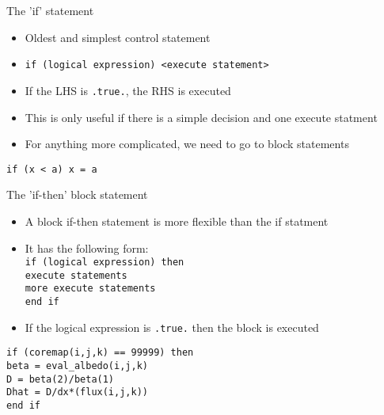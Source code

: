\documentclass{beamer}
\begin{document}
\begin{frame}{The 'if' statement}
  
  \begin{itemize}
    \item Oldest and simplest control statement
    \vfill\item \texttt{if (logical expression) <execute statement>}
    \vfill\item If the LHS is \texttt{.true.}, the RHS is executed
    \vfill\item This is only useful if there is a simple decision and one execute statment
    \vfill\item For anything more complicated, we need to go to block statements
  \end{itemize}
  \vfill
  \begin{center}
    \texttt{if (x < a) x = a}
  \end{center}
\end{frame}
\begin{frame}{The 'if-then' block statement}

  \begin{itemize}
    \item A block if-then statement is more flexible than the if statment
    \vfill\item It has the following form:\\
    \vfill\texttt{if (logical expression) then \\
	\hspace{0.5cm}execute statements  \\
	\hspace{0.5cm}more execute statements  \\
	end if \\}
    \item If the logical expression is \texttt{.true.} then the block is executed
  \end{itemize}
  \vfill
  \texttt{if (coremap(i,j,k) == 99999) then \\
    \hspace{0.5cm} beta = eval\_albedo(i,j,k) \\
    \hspace{0.5cm} D = beta(2)/beta(1) \\
    \hspace{0.5cm} Dhat = D/dx*(flux(i,j,k)) \\
    end if
    }
  
\end{frame}
\end{document}
